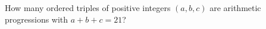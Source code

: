 How many ordered triples of positive integers $(a,b,c)$ are arithmetic progressions with $a+b+c=21$?
